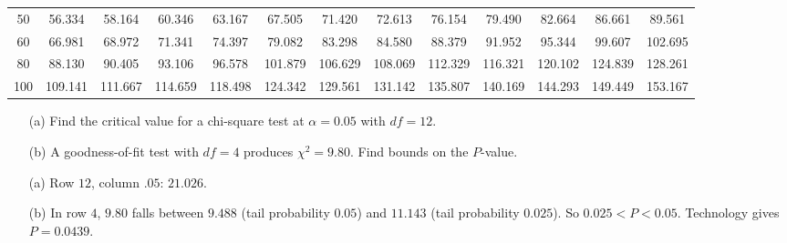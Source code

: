 \begin{table}[H]
\begin{tabular}{c|cccccccccccc}
50 & 56.334 & 58.164 & 60.346 & 63.167 & 67.505 & 71.420 & 72.613 & 76.154 & 79.490 & 82.664 & 86.661 & 89.561 \\
60 & 66.981 & 68.972 & 71.341 & 74.397 & 79.082 & 83.298 & 84.580 & 88.379 & 91.952 & 95.344 & 99.607 & 102.695 \\
80 & 88.130 & 90.405 & 93.106 & 96.578 & 101.879 & 106.629 & 108.069 & 112.329 & 116.321 & 120.102 & 124.839 & 128.261 \\
100 & 109.141 & 111.667 & 114.659 & 118.498 & 124.342 & 129.561 & 131.142 & 135.807 & 140.169 & 144.293 & 149.449 & 153.167 \\
\end{tabular}
\end{table}

\begin{Exercise}[title={Reading the chi-square table}, label={ex:chitable}]
\begin{enumerate}
    \item[(a)] Find the critical value for a chi-square test at $\alpha = 0.05$ with $df = 12$.
    \item[(b)] A goodness-of-fit test with $df = 4$ produces $\chi^2 = 9.80$. Find bounds on the $P$-value.
\end{enumerate}
\end{Exercise}

\begin{Answer}[ref={ex:chitable}]
\begin{enumerate}
    \item[(a)] Row $12$, column $.05$: $21.026$.
    \item[(b)] In row $4$, $9.80$ falls between $9.488$ (tail probability $0.05$) and $11.143$ (tail probability $0.025$). So $0.025 < P < 0.05$. Technology gives $P = 0.0439$.
\end{enumerate}
\end{Answer}
